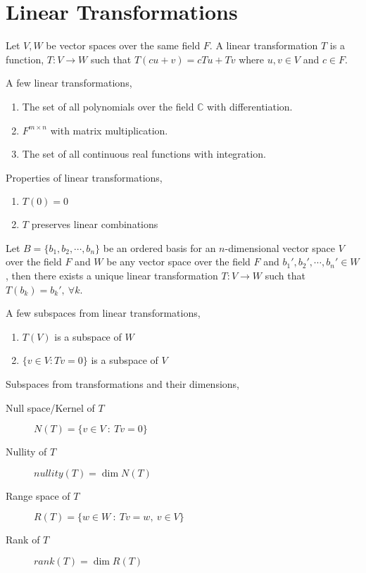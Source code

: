 \section{Linear Transformations}
	\begin{definition}
		Let $V,W$ be vector spaces over the same field $F$. A linear transformation $T$ is a function, $T : V \to W$ such that $T(cu+v) = cTu+Tv$ where $u,v \in V$ and $c \in F$.
	\end{definition}
	\begin{remark}
		A few linear transformations,
		\begin{enumerate}
			\item The set of all polynomials over the field $\mathbb{C}$ with differentiation.
			\item $F^{m \times n}$ with matrix multiplication.
			\item The set of all continuous real functions with integration.
		\end{enumerate}
	\end{remark}
	\begin{remark}
		Properties of linear transformations,
		\begin{enumerate}
			\item $T(0) = 0$
			\item $T$ preserves linear combinations
		\end{enumerate}
	\end{remark}
	\begin{theorem}
		Let $B = \{ b_1, b_2, \cdots, b_n \}$ be an ordered basis for an $n$-dimensional vector space $V$ over the field $F$ and $W$ be any vector space over the field $F$ and $b_{1}', b_{2}', \cdots, b_{n}' \in W$, then there exists a unique linear transformation $T : V \to W$ such that $T(b_k) = b_{k}',\ \forall k$.
	\end{theorem}
	\begin{remark}
		A few subspaces from linear transformations,
		\begin{enumerate}
			\item $T(V)$ is a subspace of $W$
			\item $\{ v \in V : Tv = 0 \}$ is a subspace of $V$
		\end{enumerate}
	\end{remark}
	\begin{definition}
		Subspaces from transformations and their dimensions,
		\begin{description}
			\item[Null space/Kernel of $T$] $N(T) = \{ v \in V \ : \ Tv = 0 \}$
			\item[Nullity of $T$] $nullity(T) = \dim N(T)$
			\item[Range space of $T$] $R(T) = \{ w \in W \ : \ Tv = w,\ v \in V \}$
			\item[Rank of $T$] $rank(T) = \dim R(T)$
		\end{description}
	\end{definition}
